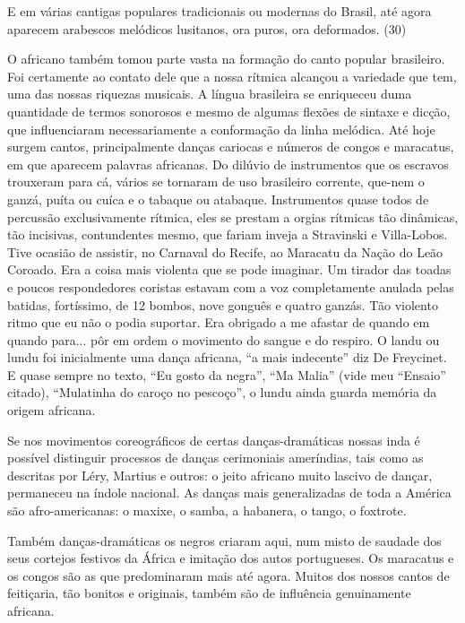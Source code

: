 E em várias cantigas populares tradicionais ou modernas do Brasil, até
agora aparecem arabescos melódicos lusitanos, ora puros, ora deformados.
(30)

O africano também tomou parte vasta na formação do canto popular
brasileiro. Foi certamente ao contato dele que a nossa rítmica alcançou
a variedade que tem, uma das nossas riquezas musicais. A língua
brasileira se enriqueceu duma quantidade de termos sonorosos e mesmo de
algumas flexões de sintaxe e dicção, que influenciaram necessariamente a
conformação da linha melódica. Até hoje surgem cantos, principalmente
danças cariocas e números de congos e maracatus, em que aparecem
palavras africanas. Do dilúvio de instrumentos que os escravos trouxeram
para cá, vários se tornaram de uso brasileiro corrente, que-nem o ganzá,
puíta ou cuíca e o tabaque ou atabaque. Instrumentos quase todos de
percussão exclusivamente rítmica, eles se prestam a orgias rítmicas tão
dinâmicas, tão incisivas, contundentes mesmo, que fariam inveja a
Stravinski e Villa-Lobos. Tive ocasião de assistir, no Carnaval do
Recife, ao Maracatu da Nação do Leão Coroado. Era a coisa mais violenta
que se pode imaginar. Um tirador das toadas e poucos respondedores
coristas estavam com a voz completamente anulada pelas batidas,
fortíssimo, de 12 bombos, nove gonguês e quatro ganzás. Tão violento
ritmo que eu não o podia suportar. Era obrigado a me afastar de quando
em quando para... pôr em ordem o movimento do sangue e do respiro. O
landu ou lundu foi inicialmente uma dança africana, ``a mais indecente''
diz De Freycinet. E quase sempre no texto, ``Eu gosto da negra'', ``Ma
Malia'' (vide meu ``Ensaio'' citado), ``Mulatinha do caroço no
pescoço'', o lundu ainda guarda memória da origem africana.

Se nos movimentos coreográficos de certas danças-dramáticas nossas inda
é possível distinguir processos de danças cerimoniais ameríndias, tais
como as descritas por Léry, Martius e outros: o jeito africano muito
lascivo de dançar, permaneceu na índole nacional. As danças mais
generalizadas de toda a América são afro-americanas: o maxixe, o samba,
a habanera, o tango, o foxtrote.

Também danças-dramáticas os negros criaram aqui, num misto de saudade
dos seus cortejos festivos da África e imitação dos autos portugueses.
Os maracatus e os congos são as que predominaram mais até agora. Muitos
dos nossos cantos de feitiçaria, tão bonitos e originais, também são de
influência genuinamente africana.

